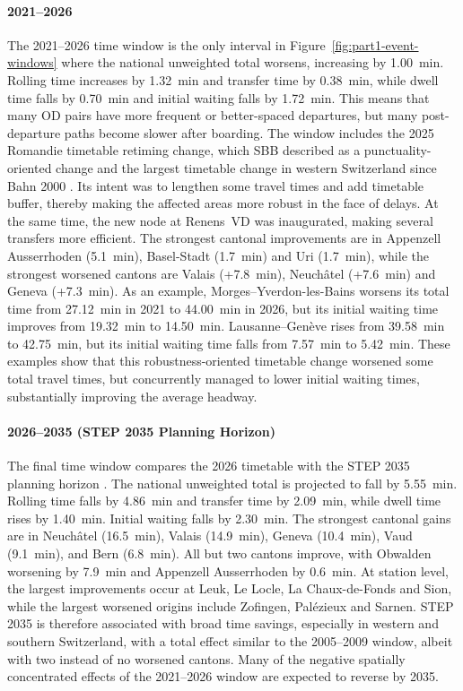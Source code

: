 \documentclass[preprint,12pt]{elsarticle}
\begin{document}
\paragraph{2021--2026}
The 2021--2026 time window is the only interval in Figure~\ref{fig:part1-event-windows} where the national unweighted total worsens, increasing by 1.00~min. Rolling time increases by 1.32~min and transfer time by 0.38~min, while dwell time falls by 0.70~min and initial waiting falls by 1.72~min. This means that many OD pairs have more frequent or better-spaced departures, but many post-departure paths become slower after boarding. The window includes the 2025 Romandie timetable retiming change, which SBB described as a punctuality-oriented change and the largest timetable change in western Switzerland since Bahn 2000 \citep{sbbRomandie2025Punctuality}. Its intent was to lengthen some travel times and add timetable buffer, thereby making the affected areas more robust in the face of delays. At the same time, the new node at Renens~VD was inaugurated, making several transfers more efficient. The strongest cantonal improvements are in Appenzell Ausserrhoden (5.1~min), Basel-Stadt (1.7~min) and Uri (1.7~min), while the strongest worsened cantons are Valais (+7.8~min), Neuchâtel (+7.6~min) and Geneva (+7.3~min). As an example, Morges--Yverdon-les-Bains worsens its total time from 27.12~min in 2021 to 44.00~min in 2026, but its initial waiting time improves from 19.32~min to 14.50~min. Lausanne--Genève rises from 39.58~min to 42.75~min, but its initial waiting time falls from 7.57~min to 5.42~min. These examples show that this robustness-oriented timetable change worsened some total travel times, but concurrently managed to lower initial waiting times, substantially improving the average headway.

\paragraph{2026--2035 (STEP 2035 Planning Horizon)}
The final time window compares the 2026 timetable with the STEP 2035 planning horizon \citep{sbbStep2035}. The national unweighted total is projected to fall by 5.55~min. Rolling time falls by 4.86~min and transfer time by 2.09~min, while dwell time rises by 1.40~min. Initial waiting falls by 2.30~min. The strongest cantonal gains are in Neuchâtel (16.5~min), Valais (14.9~min), Geneva (10.4~min), Vaud (9.1~min), and Bern (6.8~min). All but two cantons improve, with Obwalden worsening by 7.9~min and Appenzell Ausserrhoden by 0.6~min. At station level, the largest improvements occur at Leuk, Le Locle, La Chaux-de-Fonds and Sion, while the largest worsened origins include Zofingen, Palézieux and Sarnen. STEP 2035 is therefore associated with broad time savings, especially in western and southern Switzerland, with a total effect similar to the 2005--2009 window, albeit with two instead of no worsened cantons. Many of the negative spatially concentrated effects of the 2021--2026 window are expected to reverse by 2035.
\end{document}
